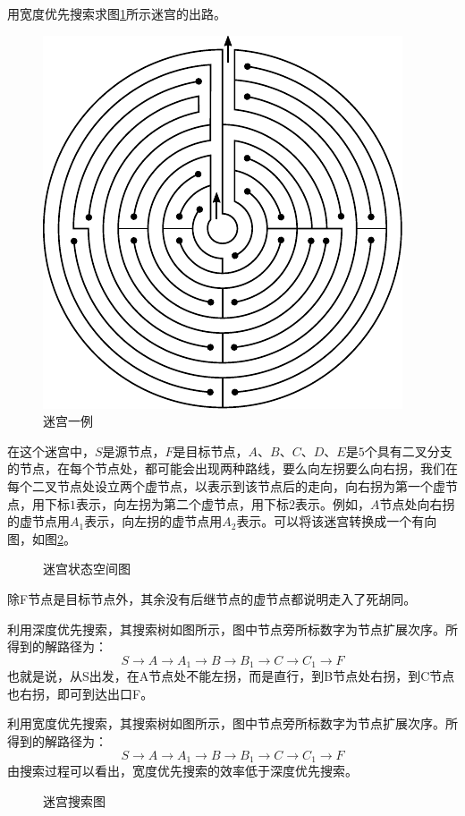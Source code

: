 \begin{question}
用宽度优先搜索求图\ref{Fig:maze}所示迷宫的出路。
	\begin{figure}[h]
		\centering
		\includegraphics{figures/ques-3.6.pdf}
		\caption{迷宫一例} \label{Fig:maze}
	\end{figure}
\end{question}
\begin{solution}
在这个迷宫中，$S$是源节点，$F$是目标节点，$A$、$B$、$C$、$D$、$E$是$5$个具有二叉分支的节点，在每个节点处，都可能会出现两种路线，要么向左拐要么向右拐，我们在每个二叉节点处设立两个虚节点，以表示到该节点后的走向，向右拐为第一个虚节点，用下标$1$表示，向左拐为第二个虚节点，用下标$2$表示。例如，$A$节点处向右拐的虚节点用$A_1$表示，向左拐的虚节点用$A_2$表示。可以将该迷宫转换成一个有向图，如图\ref{Fig:maze-states-graph}。\par
	\begin{figure} [h]
		\centering
		
		\caption{迷宫状态空间图} \label{Fig:maze-states-graph}
	\end{figure}
除F节点是目标节点外，其余没有后继节点的虚节点都说明走入了死胡同。\par
利用深度优先搜索，其搜索树如图所示，图中节点旁所标数字为节点扩展次序。所得到的解路径为：
\[ S \to A \to A_1 \to B \to B_1 \to C \to C_1 \to F \]
也就是说，从S出发，在A节点处不能左拐，而是直行，到B节点处右拐，到C节点也右拐，即可到达出口F。\par
利用宽度优先搜索，其搜索树如图所示，图中节点旁所标数字为节点扩展次序。所得到的解路径为：
\[ S \to A \to A_1 \to B \to B_1 \to C \to C_1 \to F \]
由搜索过程可以看出，宽度优先搜索的效率低于深度优先搜索。
	\begin{figure} [h]
		\centering
		\captionsetup{justification=raggedright}
		\subfloat[深度优先搜索]{\label{Fig:maze-search-graph-dfs}}\qquad
		\subfloat[宽度优先搜索]{\label{Fig:maze-search-graph-bfs}}
	    \caption{迷宫搜索图}
	\end{figure}
\end{solution}

